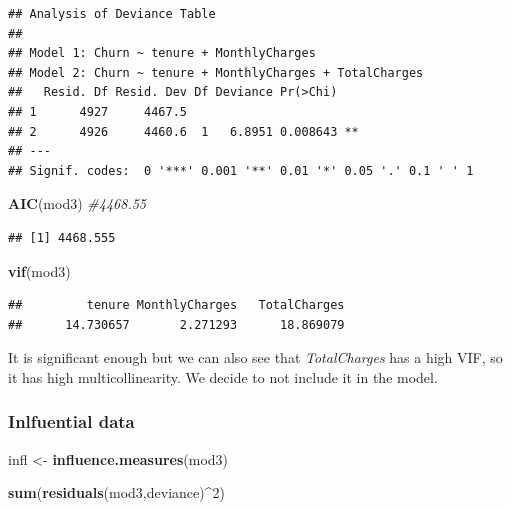 \documentclass[
  twoside]{article}
\newenvironment{Shaded}{\begin{snugshade}}{\end{snugshade}}
\newcommand{\CommentTok}[1]{\textcolor[rgb]{0.56,0.35,0.01}{\textit{#1}}}
\newcommand{\DecValTok}[1]{\textcolor[rgb]{0.00,0.00,0.81}{#1}}
\newcommand{\FunctionTok}[1]{\textcolor[rgb]{0.13,0.29,0.53}{\textbf{#1}}}
\newcommand{\NormalTok}[1]{#1}
\newcommand{\OtherTok}[1]{\textcolor[rgb]{0.56,0.35,0.01}{#1}}
\newcommand{\SpecialCharTok}[1]{\textcolor[rgb]{0.81,0.36,0.00}{\textbf{#1}}}
\newcommand{\StringTok}[1]{\textcolor[rgb]{0.31,0.60,0.02}{#1}}
\begin{document}
\begin{verbatim}
## Analysis of Deviance Table
## 
## Model 1: Churn ~ tenure + MonthlyCharges
## Model 2: Churn ~ tenure + MonthlyCharges + TotalCharges
##   Resid. Df Resid. Dev Df Deviance Pr(>Chi)   
## 1      4927     4467.5                        
## 2      4926     4460.6  1   6.8951 0.008643 **
## ---
## Signif. codes:  0 '***' 0.001 '**' 0.01 '*' 0.05 '.' 0.1 ' ' 1
\end{verbatim}

\begin{Shaded}
\begin{Highlighting}[]
\FunctionTok{AIC}\NormalTok{(mod3) }\CommentTok{\#4468.55}
\end{Highlighting}
\end{Shaded}

\begin{verbatim}
## [1] 4468.555
\end{verbatim}

\begin{Shaded}
\begin{Highlighting}[]
\FunctionTok{vif}\NormalTok{(mod3)}
\end{Highlighting}
\end{Shaded}

\begin{verbatim}
##         tenure MonthlyCharges   TotalCharges 
##      14.730657       2.271293      18.869079
\end{verbatim}

It is significant enough but we can also see that \emph{TotalCharges}
has a high VIF, so it has high multicollinearity. We decide to not
include it in the model.

\hypertarget{inlfuential-data}{%
\subsubsection{Inlfuential data}\label{inlfuential-data}}

\begin{Shaded}
\begin{Highlighting}[]
\NormalTok{infl }\OtherTok{\textless{}{-}} \FunctionTok{influence.measures}\NormalTok{(mod3)}

\FunctionTok{sum}\NormalTok{(}\FunctionTok{residuals}\NormalTok{(mod3,}\StringTok{\textquotesingle{}deviance\textquotesingle{}}\NormalTok{)}\SpecialCharTok{\^{}}\DecValTok{2}\NormalTok{)}
\end{Highlighting}
\end{Shaded}
\end{document}

